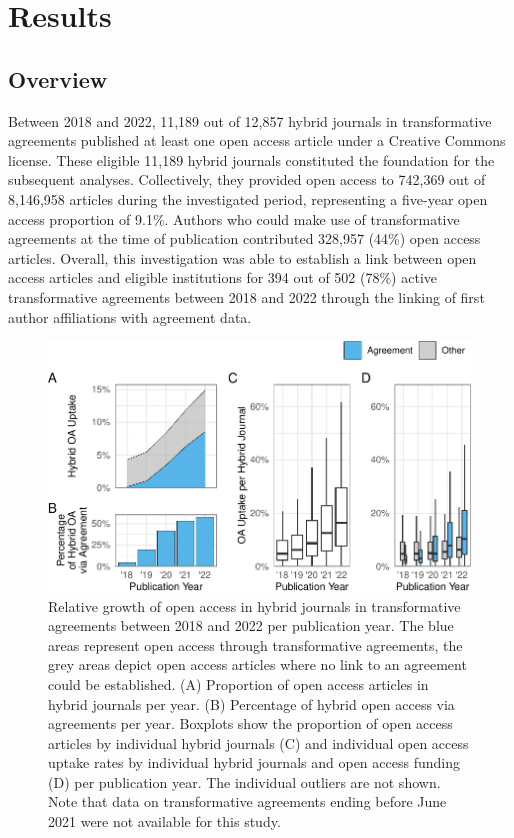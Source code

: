 \documentclass[a4paper,man,floatsintext,longtable,noextraspace,12pt]{apa6}
\begin{document}
\section{Results}\label{results}

\subsection{Overview}\label{overview}

Between 2018 and 2022, 11,189 out of 12,857 hybrid journals in
transformative agreements published at least one open access article
under a Creative Commons license. These eligible 11,189 hybrid journals
constituted the foundation for the subsequent analyses. Collectively,
they provided open access to 742,369 out of 8,146,958 articles during
the investigated period, representing a five-year open access proportion
of 9.1\%. Authors who could make use of transformative agreements at the
time of publication contributed 328,957 (44\%) open access articles.
Overall, this investigation was able to establish a link between open
access articles and eligible institutions for 394 out of 502 (78\%)
active transformative agreements between 2018 and 2022 through the
linking of first author affiliations with agreement data.

\begin{figure}[ht!]

{\centering \includegraphics[width=0.99\linewidth,]{fig/results_overview-1} 

}

\caption{Relative growth of open access in hybrid journals in transformative agreements between 2018 and 2022 per publication year. The blue areas represent open access through transformative agreements, the grey areas depict open access articles where no link to an agreement could be established. (A) Proportion of open access articles in hybrid journals per year. (B) Percentage of hybrid open access via agreements per year. Boxplots show the proportion of open access articles by individual hybrid journals (C) and individual open access uptake rates by individual hybrid journals and open access funding (D) per publication year. The individual outliers are not shown. Note that data on transformative agreements ending before June 2021 were not available for this study.}\label{fig:results_overview}
\end{figure}
\end{document}
